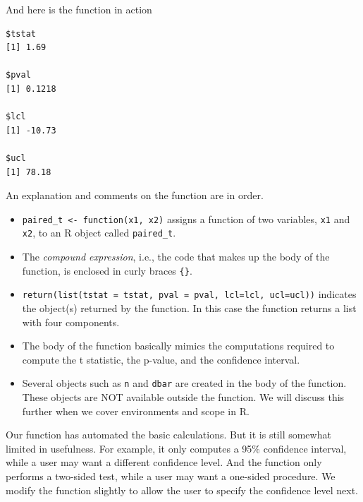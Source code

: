\documentclass[]{krantz}
\makeatletter
\newenvironment{Shaded}{\begin{snugshade}}{\end{snugshade}}
\newcommand{\KeywordTok}[1]{\textcolor[rgb]{0.27,0.27,0.27}{\textbf{#1}}}
\newcommand{\DataTypeTok}[1]{\textcolor[rgb]{0.27,0.27,0.27}{#1}}
\newcommand{\StringTok}[1]{\textcolor[rgb]{0.5,0.5,0.5}{#1}}
\newcommand{\OperatorTok}[1]{\textcolor[rgb]{0.43,0.43,0.43}{\textbf{#1}}}
\newcommand{\NormalTok}[1]{#1}
\providecommand{\tightlist}{%
  \setlength{\itemsep}{0pt}\setlength{\parskip}{0pt}}
\newenvironment{kframe}{%
\medskip{}
\setlength{\fboxsep}{.8em}
 \def\at@end@of@kframe{}%
 \ifinner\ifhmode%
  \def\at@end@of@kframe{\end{minipage}}%
  \begin{minipage}{\columnwidth}%
 \fi\fi%
 \def\FrameCommand##1{\hskip\@totalleftmargin \hskip-\fboxsep
 \colorbox{shadecolor}{##1}\hskip-\fboxsep
     \hskip-\linewidth \hskip-\@totalleftmargin \hskip\columnwidth}%
 \MakeFramed {\advance\hsize-\width
   \@totalleftmargin\z@ \linewidth\hsize
   \@setminipage}}%
 {\par\unskip\endMakeFramed%
 \at@end@of@kframe}
\renewenvironment{Shaded}{\begin{kframe}}{\end{kframe}}
\makeatother
\begin{document}
And here is the function in action

\begin{Shaded}
\end{Shaded}

\begin{verbatim}
$tstat
[1] 1.69

$pval
[1] 0.1218

$lcl
[1] -10.73

$ucl
[1] 78.18
\end{verbatim}

An explanation and comments on the function are in order.

\begin{itemize}
\tightlist
\item
  \texttt{paired\_t\ \textless{}-\ function(x1,\ x2)} assigns a function
  of two variables, \texttt{x1} and \texttt{x2}, to an R object called
  \texttt{paired\_t}.
\item
  The \emph{compound expression}, i.e., the code that makes up the body
  of the function, is enclosed in curly braces \texttt{\{\}}.
\item
  \texttt{return(list(tstat\ =\ tstat,\ pval\ =\ pval,\ lcl=lcl,\ ucl=ucl))}
  indicates the object(s) returned by the function. In this case the
  function returns a list with four components.
\item
  The body of the function basically mimics the computations required to
  compute the t statistic, the p-value, and the confidence interval.
\item
  Several objects such as \texttt{n} and \texttt{dbar} are created in
  the body of the function. These objects are NOT available outside the
  function. We will discuss this further when we cover environments and
  scope in R.
\end{itemize}

Our function has automated the basic calculations. But it is still
somewhat limited in usefulness. For example, it only computes a 95\%
confidence interval, while a user may want a different confidence level.
And the function only performs a two-sided test, while a user may want a
one-sided procedure. We modify the function slightly to allow the user
to specify the confidence level next.
\end{document}
